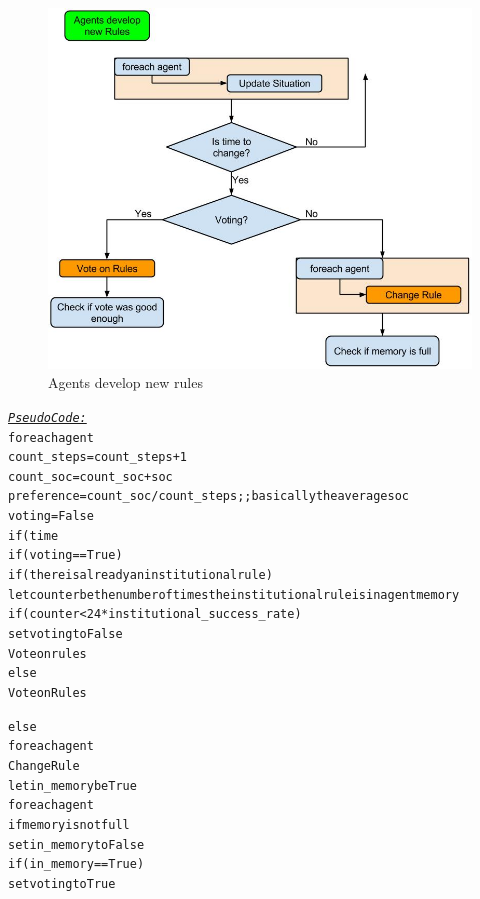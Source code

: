\documentclass[a4paper]{article}
\begin{document}
\begin{figure}[!ht]
\includegraphics[width =\textwidth]{agents_develop_rules.jpg}
\caption{Agents develop new rules}
\label{agents_develop_rules}
\end{figure}
\begin{alltt}
 \underline{\textit{Pseudo Code:}}
foreach agent
    count_steps = count_steps + 1
    count_soc = count_soc + soc
    preference = count_soc / count _steps ;; basically the average soc 
voting = False
if (time %
    if (voting == True)             
        if (there is already an institutional rule)
            let counter be the number of times the institutional rule is in agent memory
            if (counter < 24 * institutional_success_rate)
                set voting to False
            Vote on rules
else 
            Vote on Rules

    else 
        foreach agent
            Change Rule
        let in_memory be  True
foreach agent
            if memory is not full 
                set in_memory to False
        if (in_memory == True)
            set voting to True
\end{alltt}
\end{document}
